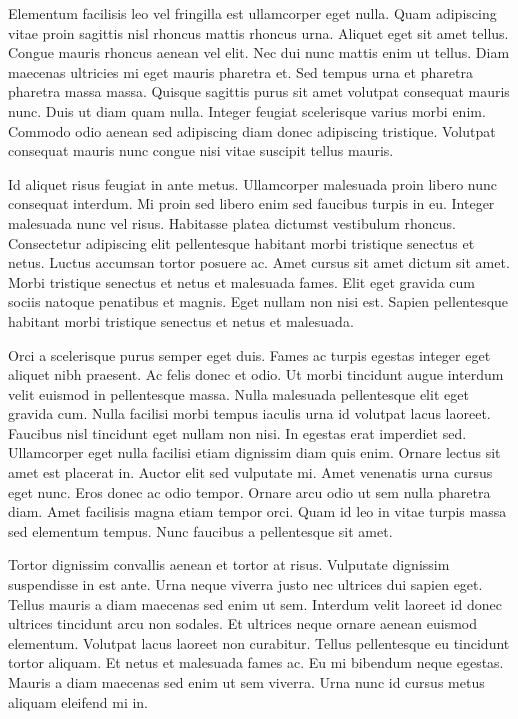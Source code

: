 \documentclass[11pt,a4paper]{article}
\begin{document}
Elementum facilisis leo vel fringilla est ullamcorper eget nulla. Quam adipiscing vitae proin sagittis nisl rhoncus mattis rhoncus urna. Aliquet eget sit amet tellus. Congue mauris rhoncus aenean vel elit. Nec dui nunc mattis enim ut tellus. Diam maecenas ultricies mi eget mauris pharetra et. Sed tempus urna et pharetra pharetra massa massa. Quisque sagittis purus sit amet volutpat consequat mauris nunc. Duis ut diam quam nulla. Integer feugiat scelerisque varius morbi enim. Commodo odio aenean sed adipiscing diam donec adipiscing tristique. Volutpat consequat mauris nunc congue nisi vitae suscipit tellus mauris.

Id aliquet risus feugiat in ante metus. Ullamcorper malesuada proin libero nunc consequat interdum. Mi proin sed libero enim sed faucibus turpis in eu. Integer malesuada nunc vel risus. Habitasse platea dictumst vestibulum rhoncus. Consectetur adipiscing elit pellentesque habitant morbi tristique senectus et netus. Luctus accumsan tortor posuere ac. Amet cursus sit amet dictum sit amet. Morbi tristique senectus et netus et malesuada fames. Elit eget gravida cum sociis natoque penatibus et magnis. Eget nullam non nisi est. Sapien pellentesque habitant morbi tristique senectus et netus et malesuada.

Orci a scelerisque purus semper eget duis. Fames ac turpis egestas integer eget aliquet nibh praesent. Ac felis donec et odio. Ut morbi tincidunt augue interdum velit euismod in pellentesque massa. Nulla malesuada pellentesque elit eget gravida cum. Nulla facilisi morbi tempus iaculis urna id volutpat lacus laoreet. Faucibus nisl tincidunt eget nullam non nisi. In egestas erat imperdiet sed. Ullamcorper eget nulla facilisi etiam dignissim diam quis enim. Ornare lectus sit amet est placerat in. Auctor elit sed vulputate mi. Amet venenatis urna cursus eget nunc. Eros donec ac odio tempor. Ornare arcu odio ut sem nulla pharetra diam. Amet facilisis magna etiam tempor orci. Quam id leo in vitae turpis massa sed elementum tempus. Nunc faucibus a pellentesque sit amet.

Tortor dignissim convallis aenean et tortor at risus. Vulputate dignissim suspendisse in est ante. Urna neque viverra justo nec ultrices dui sapien eget. Tellus mauris a diam maecenas sed enim ut sem. Interdum velit laoreet id donec ultrices tincidunt arcu non sodales. Et ultrices neque ornare aenean euismod elementum. Volutpat lacus laoreet non curabitur. Tellus pellentesque eu tincidunt tortor aliquam. Et netus et malesuada fames ac. Eu mi bibendum neque egestas. Mauris a diam maecenas sed enim ut sem viverra. Urna nunc id cursus metus aliquam eleifend mi in.
\end{document}

